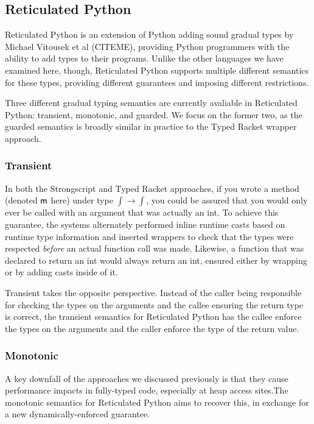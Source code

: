 \documentclass[preprint]{sigplanconf}
\newcommand{\m}{\M{\xt{m}}}
\newcommand{\M}[1]{\ensuremath{#1}\xspace}
\newcommand{\xt}[1]{{\sf{#1}}\xspace}
\begin{document}
\subsection{Reticulated Python}

Reticulated Python is an extension of Python adding sound gradual types by Michael 
Vitousek et al (CITEME), providing Python programmers with the ability to add types
to their programs. Unlike the other languages we have examined here, though, Reticulated
Python supports multiple different semantics for these types, providing different guarantees
and imposing different restrictions.

Three different gradual typing semantics are currently avaliable in Reticulated Python:
transient, monotonic, and guarded. We focus on the former two, as the guarded semantics
is broadly similar in practice to the Typed Racket wrapper approach.

\subsubsection{Transient}

In both the Strongscript and Typed Racket approaches, if you wrote a method (denoted $\m$ here)
under type $\int \rightarrow \int$, you could be assured that you would only ever be called
with an argument that was actually an int. To achieve this guarantee, the systems alternately
performed inline runtime casts based on runtime type information and inserted wrappers to
check that the types were respected \emph{before} an actual function call was made. Likewise,
a function that was declared to return an int would always return an int, ensured either by
wrapping or by adding casts inside of it.

Transient takes the opposite perspective. Instead of the caller being responsible for
checking the types on the arguments and the callee ensuring the return type is correct,
the transient semantics for Reticulated Python has the callee enforce the types on the
arguments and the caller enforce the type of the return value.

\subsubsection{Monotonic}
A key downfall of the approaches we discussed previously is that they
cause performance impacts in fully-typed code, especially at heap access
sites.The monotonic semantics for Reticulated Python aims to recover this,
in exchange for a new dynamically-enforced guarantee.
\end{document}
